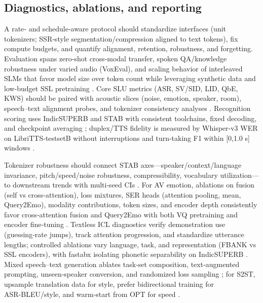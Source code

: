 \documentclass{article}
\begin{document}
\subsection{Diagnostics, ablations, and reporting} \label{subsec:Diagnostics, ablations, and reporting}
A rate‑ and schedule‑aware protocol should standardize interfaces (unit tokenizers; SSR‑style segmentation/compression aligned to text tokens), fix compute budgets, and quantify alignment, retention, robustness, and forgetting. Evaluation spans zero‑shot cross‑modal transfer, spoken QA/knowledge robustness under varied audio (VoxEval), and scaling behavior of interleaved SLMs that favor model size over token count while leveraging synthetic data and low‑budget SSL pretraining \cite{cui2025voxevalbenchmarkingknowledgeunderstandin,maimon2025scalinganalysisinterleavedspeechtextlang,tan2025ssralignmentawaremodalityconnectorspeech,chen2023reducingbarriersselfsupervisedlearninghu,entry2025towardjointlanguagemodelingspeechunitste}. Core SLU metrics (ASR, SV/SID, LID, QbE, KWS) should be paired with acoustic slices (noise, emotion, speaker, room), speech–text alignment probes, and tokenizer consistency analyses \cite{har-tuv2025pastphoneticacousticspeechtokenizer,turetzky2024lastlanguagemodelawarespeechtokenization,bai2025dmelspeechtokenizationmadesimple,entry2025indicsuperbspeechprocessinguniversalperf,maimon2025salmonsuiteacousticlanguagemodelevaluati}. Recognition scoring uses IndicSUPERB and STAB with consistent toolchains, fixed decoding, and checkpoint averaging \cite{vashishth2024stabspeechtokenizerassessmentbenchmark,entry2025indicsuperbspeechprocessinguniversalperf}; duplex/TTS fidelity is measured by Whisper‑v3 WER on LibriTTS‑testsetB without interruptions and turn‑taking F1 within [0,1.0 s] windows \cite{ma2024languagemodelcanlistenwhilespeaking}.

Tokenizer robustness should connect STAB axes—speaker/context/language invariance, pitch/speed/noise robustness, compressibility, vocabulary utilization—to downstream trends with multi‑seed CIs \cite{vashishth2024stabspeechtokenizerassessmentbenchmark}. For AV emotion, ablations on fusion (self vs cross‑attention), loss mixtures, SER heads (attention pooling, mean, Query2Emo), modality contributions, token sizes, and encoder depth consistently favor cross‑attention fusion and Query2Emo with both VQ pretraining and encoder fine‑tuning \cite{sadok2025vectorquantizedmaskedautoencoderaudiovis}. Textless ICL diagnostics verify demonstration use (guessing‑rate jumps), track attention progression, and standardize utterance lengths; controlled ablations vary language, task, and representation (FBANK vs SSL encoders), with fastabx isolating phonetic separability on IndicSUPERB \cite{hsu2024exploringcontextlearningtextlessspeechla,poli2025fastabxlibraryefficientcomputationabxdis,entry2025indicsuperbspeechprocessinguniversalperf}. Mixed speech–text generation ablates task‑set composition, text‑augmented prompting, unseen‑speaker conversion, and randomized loss sampling \cite{wu2024speechcomposerunifyingmultiplespeechtask}; for S2ST, upsample translation data for style, prefer bidirectional training for ASR‑BLEU/style, and warm‑start from OPT for speed \cite{peng2024mslms2stmultitaskspeechlanguagemodeltext}.
\end{document}
